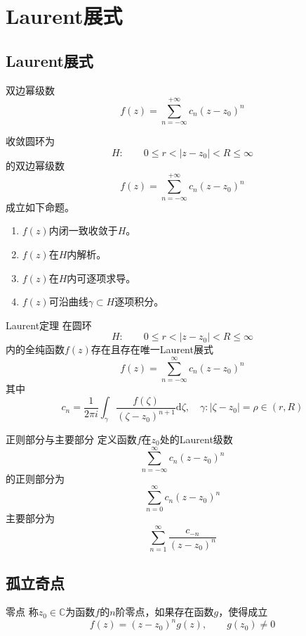 \documentclass[lang = cn, scheme = chinese, thmcnt = section]{elegantbook}
\newcommand{\C}{\mathbb{C}}  		   %
\newcommand{\sub}{\subset}             %
\begin{document}
\chapter{Laurent展式}

\section{Laurent展式}

\begin{definition}{双边幂级数}
	$$
	f(z)=\sum_{n=-\infty}^{+\infty}{c_n(z-z_0)^n}
	$$
\end{definition}

\begin{definition}
	收敛圆环为
	$$
	H:\qquad 0\le r<|z-z_0|<R\le\infty
	$$
	的双边幂级数
	$$
	f(z)=\sum_{n=-\infty}^{+\infty}{c_n(z-z_0)^n}
	$$
	成立如下命题。
	\begin{enumerate}
		\item $f(z)$内闭一致收敛于$H$。
		\item $f(z)$在$H$内解析。
		\item $f(z)$在$H$内可逐项求导。
		\item $f(z)$可沿曲线$\gamma\sub H$逐项积分。
	\end{enumerate}
\end{definition}

\begin{theorem}{Laurent定理}
	在圆环
	$$
	H:\qquad 0\le r<|z-z_0|<R\le\infty
	$$
	内的全纯函数$f(z)$存在且存在唯一Laurent展式
	$$
	f(z)=\sum_{n=-\infty}^{\infty}{c_n(z-z_0)^n}
	$$
	其中
	$$
	c_n=\frac{1}{2\pi i}\int_{\gamma}{\frac{f(\zeta)}{(\zeta-z_0)^{n+1}}\mathrm{d}\zeta},\quad \gamma:|\zeta-z_0|=\rho\in(r,R)
	$$
\end{theorem}

\begin{definition}{正则部分与主要部分}
	定义函数$f$在$z_0$处的Laurent级数%
	$$
	\sum_{n=-\infty}^{\infty}{c_n(z-z_0)^n}
	$$
	的正则部分为%
	$$
	\sum_{n=0}^{\infty}{c_n(z-z_0)^n}
	$$
	主要部分为%
	$$
	\sum_{n=1}^{\infty}{\frac{c_{-n}}{(z-z_0)^n}}
	$$
\end{definition}

\section{孤立奇点}

\begin{definition}{零点}
	称$z_0\in\C$为函数$f$的$n$阶零点，如果存在函数$g$，使得成立%
	$$
	f(z)=(z-z_0)^ng(z),\qquad 
	g(z_0)\ne 0
	$$
\end{definition}
\end{document}
